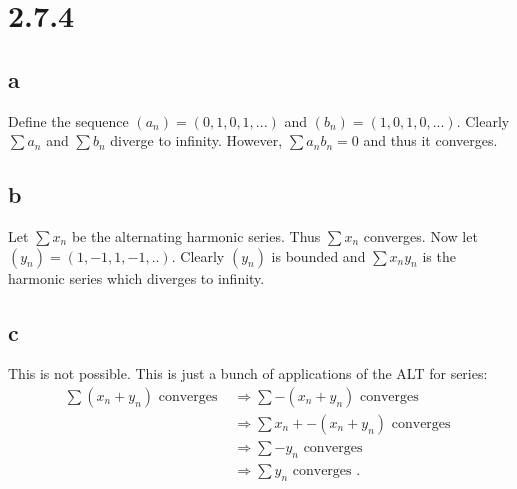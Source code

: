 \documentclass[10pt]{article}
\begin{document}

\section*{2.7.4}

\subsection*{a}
Define the sequence $(a_n) = (0,1,0,1,...)$ and $(b_n) = (1,0,1,0,...).$
Clearly $\sum a_n$ and $\sum b_n$ diverge to infinity. However, $\sum a_nb_n = 0$ and thus it converges.

\subsection*{b}

Let $\sum x_n$ be the alternating harmonic series. Thus $\sum x_n$ converges. Now let $(y_n) = (1,-1,1,-1,..).$ Clearly $(y_n)$ is bounded and $\sum x_ny_n$ is the harmonic series which diverges to infinity.

\subsection*{c}

This is not possible. This is just a bunch of applications of the ALT for series:
\begin{align*}
    \sum (x_n+y_n)\text{ converges }&\Rightarrow \sum -(x_n+y_n)\text{ converges }\\
    &\Rightarrow \sum x_n+ -(x_n+y_n)\text{ converges }\\
    &\Rightarrow \sum -y_n\text{ converges }\\
    &\Rightarrow \sum y_n\text{ converges }.
\end{align*}
\end{document}
